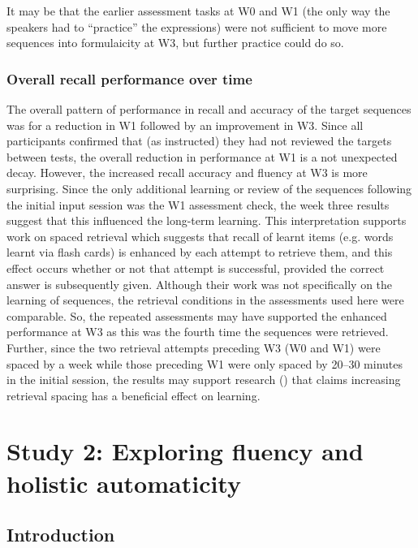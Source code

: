 \documentclass[output=paper]{langscibook}
\begin{document}
It may be that the earlier assessment tasks at W0 and W1 (the only way the speakers had to ``practice'' the expressions) were not sufficient to move more sequences into formulaicity at W3, but further practice could do so. 

\subsubsection{Overall recall performance over time}\label{sec:cutler:2.3.3}
The overall pattern of performance in recall and accuracy of the target sequences was for a reduction in W1 followed by an improvement in W3. Since all participants confirmed that (as instructed) they had not reviewed the targets between tests, the overall reduction in performance at W1 is a not unexpected decay. However, the increased recall accuracy and fluency at W3 is more surprising. Since the only additional learning or review of the sequences following the initial input session was the W1 assessment check, the week three results suggest that this influenced the long-term learning. This interpretation supports work on spaced retrieval \citep{KornellEtAl2015} which suggests that recall of learnt items (e.g. words learnt via flash cards) is enhanced by each attempt to retrieve them, and this effect occurs whether or not that attempt is successful, provided the correct answer is subsequently given. Although their work was not specifically on the learning of sequences, the retrieval conditions in the assessments used here were comparable. So, the repeated assessments may have supported the enhanced performance at W3 as this was the fourth time the sequences were retrieved. Further, since the two retrieval attempts preceding W3 (W0 and W1) were spaced by a week while those preceding W1 were only spaced by 20--30 minutes in the initial session, the results may support research (\citealt{KornellVaughn2016}) that claims increasing retrieval spacing has a beneficial effect on learning. 

\section{Study 2: Exploring fluency and holistic automaticity}
\subsection{Introduction}
\end{document}
